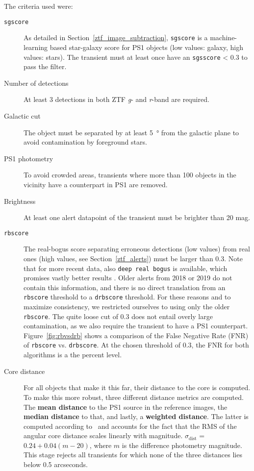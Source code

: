The criteria used were:
\begin{description}
    \item[\texttt{sgscore}] As detailed in Section~\ref{ztf_image_subtraction}, \texttt{sgscore} is a machine-learning based star-galaxy score for PS1 objects (low values: galaxy, high values: stars). The transient must at least once have an \texttt{sgsscore} < 0.3 to pass the filter.
    \item[Number of detections] At least 3 detections in both ZTF \textit{g}- and \textit{r}-band are required.
    \item[Galactic cut] The object must be separated by at least \SI{5}{\degree} from the galactic plane to avoid contamination by foreground stars.
    \item[PS1 photometry] To avoid crowded areas, transients where more than 100 objects in the vicinity have a counterpart in PS1 are removed.
    \item[Brightness] At least one alert datapoint of the transient must be brighter than 20 mag.
    \item[\texttt{rbscore}] The real-bogus score separating erroneous detections (low values) from real ones (high values, see Section~\ref{ztf_alerts}) must be larger than 0.3. Note that for more recent data, also \texttt{deep real bogus} is available, which promises vastly better results . Older alerts from 2018 or 2019 do not contain this information, and there is no direct translation from an \texttt{rbscore} threshold to a \texttt{drbscore} threshold. For these reasons and to maximize consistency, we restricted ourselves to using only the older \texttt{rbscore}. The quite loose cut of 0.3 does not entail overly large contamination, as we also require the transient to have a PS1 counterpart. Figure~\ref{fig:rbvsdrb} shows a comparison of the False Negative Rate (FNR) of \texttt{rbscore} vs. \texttt{drbscore}. At the chosen threshold of $0.3$, the FNR for both algorithms is a the percent level.
    \item[Core distance] For all objects that make it this far, their distance to the core is computed. To make this more robust, three different distance metrics are computed. The \textbf{mean distance} to the PS1 source in the reference images, the \textbf{median distance} to that, and lastly, a \textbf{weighted distance}. The latter is computed according to~ and accounts for the fact that the RMS of the angular core distance scales linearly with magnitude. $\sigma_\text{dist}$ = $0.24 + 0.04(m-20)$, where $m$ is the difference photometry magnitude. This stage rejects all transients for which none of the three distances lies below 0.5 arcseconds.
\end{description}


